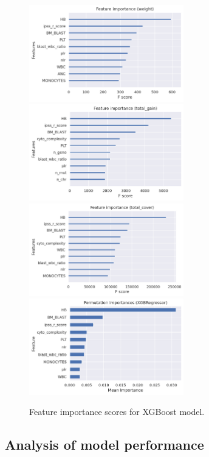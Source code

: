 \documentclass{article}
\begin{document}
\begin{figure}[h]
    \centering
    \includegraphics[width=0.6\textwidth]{img/feature_importance_xgb_weight.png}
    \includegraphics[width=0.6\textwidth]{img/feature_importance_xgb_total_gain.png}
    \includegraphics[width=0.6\textwidth]{img/feature_importance_xgb_total_cover.png}
    \includegraphics[width=0.6\textwidth]{img/permutation_importance_xgb.png}
    \caption{Feature importance scores for XGBoost model.}
    \label{fig:feature_importance}
\end{figure}


\subsection{Analysis of model performance}
\end{document}
